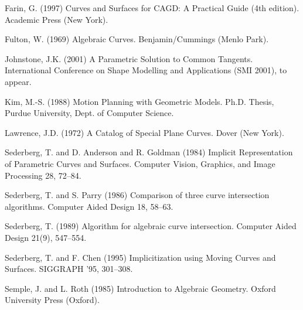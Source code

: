 \documentclass[twocolumn,10pt]{article}
\begin{document}

\begin{thebibliography}{1}

Farin, G. (1997)
Curves and Surfaces for CAGD: A Practical Guide (4th edition).
Academic Press (New York).

Fulton, W. (1969)
Algebraic Curves.
Benjamin/Cummings (Menlo Park).

Johnstone, J.K. (2001)
A Parametric Solution to Common Tangents.
International Conference on Shape Modelling and Applications (SMI 2001),
to appear.

Kim, M.-S. (1988)
Motion Planning with Geometric Models.
Ph.D. Thesis, Purdue University, Dept. of Computer Science.

Lawrence, J.D. (1972)
A Catalog of Special Plane Curves.
Dover (New York).

Sederberg, T. and D. Anderson and R. Goldman (1984)
Implicit Representation of Parametric Curves and Surfaces.
Computer Vision, Graphics, and Image Processing 28, 72--84.

Sederberg, T. and S. Parry (1986)
Comparison of three curve intersection algorithms.
Computer Aided Design 18, 58--63.

Sederberg, T. (1989)
Algorithm for algebraic curve intersection.
Computer Aided Design 21(9), 547--554.

Sederberg, T. and F. Chen (1995)
Implicitization using Moving Curves and Surfaces.
SIGGRAPH '95, 301--308.

Semple, J. and L. Roth (1985)
Introduction to Algebraic Geometry.
Oxford University Press (Oxford).

\end{thebibliography}
\end{document}
